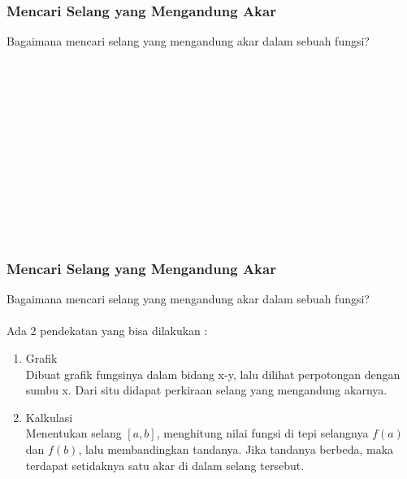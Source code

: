 \documentclass{beamer}
\begin{document}

\begin{frame}
\frametitle{Mencari Selang yang Mengandung Akar}
Bagaimana mencari selang yang mengandung akar dalam sebuah fungsi?
\\\ \\\ \\\ \\\ \\\ \\\ \\\ \\\ \\\ \\\ \\\ \\\
\end{frame}


\begin{frame}
\frametitle{Mencari Selang yang Mengandung Akar}
Bagaimana mencari selang yang mengandung akar dalam sebuah fungsi?
\\\ \\Ada 2 pendekatan yang bisa dilakukan :
\begin{enumerate}
\item Grafik \\Dibuat grafik fungsinya dalam bidang x-y, lalu dilihat perpotongan dengan sumbu x. Dari situ didapat perkiraan selang yang mengandung akarnya.
\item Kalkulasi \\Menentukan selang $[a,b]$, menghitung nilai fungsi di tepi selangnya $f(a)$ dan $f(b)$, lalu membandingkan tandanya. Jika tandanya berbeda, maka terdapat setidaknya satu akar di dalam selang tersebut.
\end{enumerate}
\end{frame}

\end{document}
